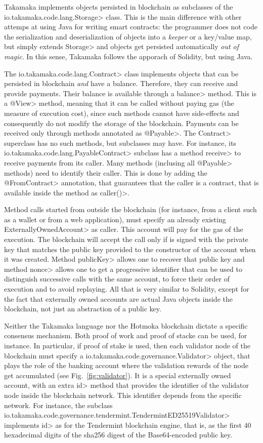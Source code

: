 Takamaka implements objects persisted in blockchain as subclasses of the
\<io.takamaka.code.lang.Storage> class.
This is the main difference with other attemps at using Java for writing smart contracts:
the programmer does not code the serialization and deserialization of objects into
a \emph{keeper} or a key/value map, but simply extends \<Storage> and objects get
persisted automatically \emph{out of magic}. In this sense, Takamaka follows the apporach of
Solidity, but using Java.

The \<io.takamaka.code.lang.Contract> class implements objects that can be
persisted in blockchain \emph{and} have a balance. Therefore, they can receive and provide payments.
Their balance is available through a \<balance> method. This is a \<@View> method, meaning
that it can be called without paying gas (the measure of execution cost), since such methods
cannot have side-effects and consequently do not modify the storage of the blockchain.
Payments can be received only through methods annotated as \<@Payable>.
The \<Contract> superclass has no such methods, but subclasses may have.
For instance, its \<io.takamaka.code.lang.PayableContract> subclass has
a method \<receive> to receive payments from its caller. Many methods (inclusing all
\<@Payable> methods) need to identify their caller. This is done by adding the
\<@FromContract> annotation, that guarantees that the caller is a contract, that is available
inside the method as \<caller()>.

Method calls started from outside the blockchain (for instance, from a client such as a wallet
or from a web application), must specify an already existing \<ExternallyOwnedAccount>
as caller. This account will pay for the gas of the execution. The blockchain will accept
the call only if is signed with the private key that matches the public key provided to
the constructor of the account when it was created. Method \<publicKey> allows one to
recover that public key and method \<nonce> allows one to get a progressive identifier that
can be used to distinguish successive calls with the same account, to force their order
of execution and to avoid replaying.
All that is very similar to Solidity, except for the fact that externally owned accounts
are actual Java objects inside the blockchain, not just an abstraction of a public key.

Neither the Takamaka language nor the Hotmoka blockchain dictate a specific consensus mechanism.
Both proof of work and proof of stacke can be used, for instance. In particular, if proof of stake
is used, then each validator node of the blockchain must specify a
\<io.takamaka.code.governance.Validator> object, that plays the role of the
banking account where the validation rewards of the node get accumulated (see Fig.~\ref{fig:validator}).
It is a special externally owned account, with an extra \<id> method that provides the
identifier of the validator node inside the blockchain network. This identifier depends from the
specific network.
For instance, the subclass
\<io.takamaka.code.governance.tendermint.TendermintED25519Validator>
implements \<id> as for the Tendermint blockchain engine, that is,
as the first $40$ hexadecimal digits of the sha256 digest of the Base64-encoded public key.

